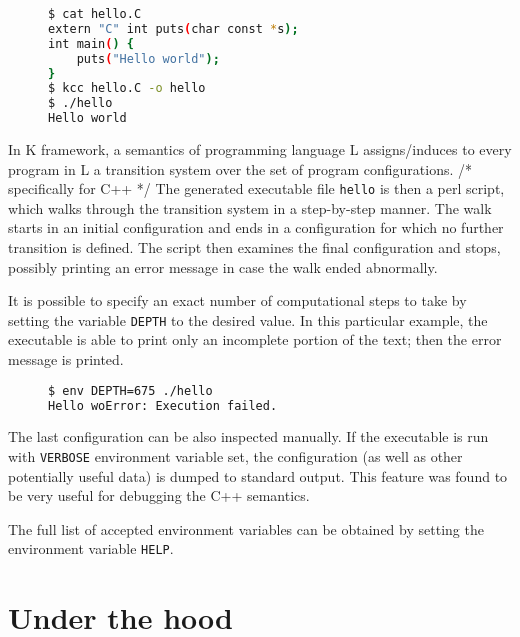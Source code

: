 \documentclass{fithesis3}
\begin{document}
\begin{figure}[h]
\begin{lstlisting}[language=bash, basicstyle=\footnotesize\ttfamily]
$ cat hello.C
extern "C" int puts(char const *s);
int main() {
	puts("Hello world");
}
$ kcc hello.C -o hello
$ ./hello
Hello world
\end{lstlisting}
\end{figure}

In K framework, a semantics of programming language L assigns/induces to every program in L a transition system over the set of program configurations. /* specifically for C++ */ The generated executable file \texttt{hello} is then a perl script, which walks through the transition system in a step-by-step manner. The walk starts in an initial configuration and ends in a configuration for which no further transition is defined. The script then examines the final configuration and stops, possibly printing an error message in case the walk ended abnormally.

It is possible to specify an exact number of computational steps to take by setting the variable \texttt{DEPTH} to the desired value. In this particular example, the executable is able to print only an incomplete portion of the text; then the error message is printed. 

\begin{figure}[h]
\begin{lstlisting}[language=bash, basicstyle=\footnotesize\ttfamily]
$ env DEPTH=675 ./hello
Hello woError: Execution failed.
\end{lstlisting}
\end{figure}

The last configuration can be also inspected manually. If the executable is run with \texttt{VERBOSE} environment variable set, the configuration (as well as other potentially useful data) is dumped to standard output. This feature was found to be very useful for debugging the C++ semantics.

The full list of accepted environment variables can be obtained by setting the environment variable \texttt{HELP}.


\section{Under the hood}
\end{document}
